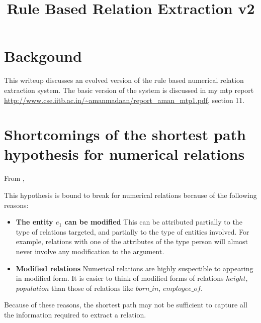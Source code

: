 \documentclass[a4paper,10pt]{article}
\title{Rule Based Relation Extraction v2}
\author{}
\begin{document}
\maketitle

\section{Backgound}
This writeup discusses an evolved version of the rule based numerical relation extraction system. The basic version of the system is discussed in my mtp report \url{http://www.cse.iitb.ac.in/~amanmadaan/report_aman_mtp1.pdf}, section 11.

\section{Shortcomings of the shortest path hypothesis for numerical relations}
From \cite{shortestpathdep}, \emph{}

This hypothesis is bound to break for numerical relations because of the following reasons:

\begin{itemize}
 \item \textbf{The entity $e_1$ can be modified}
 This can be attributed partially to the type of 
 relations targeted, and partially to the type of entities involved. 
 For example, relations with one of the attributes of the type person will almost never involve any modification to the argument.
 
 \item \textbf{Modified relations}
 Numerical relations are highly suspectible to appearing in modified form. It is easier to think of modified forms of 
 relations $height$, $population$ than those of relations like $born\_in$, $employee\_of$.
 \end{itemize}


 Because of these reasons, the shortest path may not be sufficient to capture all the information required to extract a relation.
\end{document}
